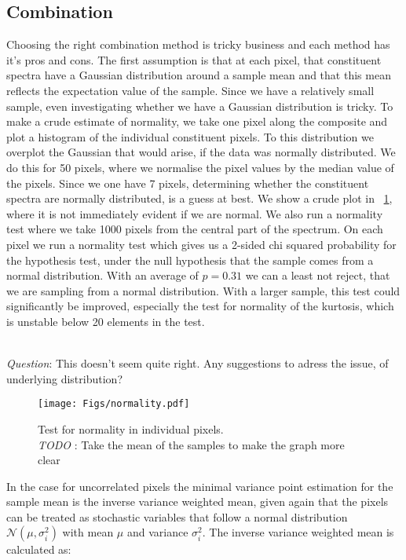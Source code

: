\documentclass{aa}    %
\newcommand{\figref}[1]{\ref{fig:#1}}
\newcommand{\Fig}[1]{\figurename~\figref{#1}}
\newcommand{\fig}[1]{\Fig{#1}}
\newcommand{\figlabel}[1]{\label{fig:#1}}
\newcommand{\sectlabel}[1]{\label{sect:#1}}
\newcommand{\todo}[3]{{\color{#2}\emph{#1}: #3}}
\newcommand{\jstodo}[1]{\todo{ \\TODO }{red}{#1}}
\newcommand{\qtodo}[1]{\todo{\\ Question}{red}{#1}}
\begin{document}
\subsection{Combination}  \sectlabel{combine}

Choosing the right combination method is tricky business and each method has it's pros and cons. The first assumption is that at each pixel, that constituent spectra have a Gaussian distribution around a sample mean and that this mean reflects the expectation value of the sample. Since we have a relatively small sample, even investigating whether we have a Gaussian distribution is tricky. To make a crude estimate of normality, we take one pixel along the composite and plot a histogram of the individual constituent pixels. To this distribution we overplot the Gaussian that would arise, if the data was normally distributed. We do this for 50 pixels, where we normalise the pixel values by the median value of the pixels. Since we one have 7 pixels, determining whether the constituent spectra are normally distributed, is a guess at best. We show a crude plot in \fig{normality}, where it is not immediately evident if we are normal. We also run a normality test where we take 1000 pixels from the central part of the spectrum. On each pixel we run a normality test which gives us a 2-sided chi squared probability for the hypothesis test, under the null hypothesis that the sample comes from a normal distribution. With an average of $p = 0.31$ we can a least not reject, that we are sampling from a normal distribution. With a larger sample, this test could significantly be improved, especially the test for normality of the kurtosis, which is unstable below 20 elements in the test. 

\qtodo{This doesn't seem quite right. Any suggestions to adress the issue, of underlying distribution?}

\begin{figure}[hbtp]
  \centering
  \texttt{[image: Figs/normality.pdf]}
  \caption[]{Test for normality in individual pixels. \jstodo{Take the mean of the samples to make the graph more clear}}
 \figlabel{normality}
\end{figure}

In the case for uncorrelated pixels the minimal variance point estimation for the sample mean is the inverse variance weighted mean, given again that the pixels can be treated as stochastic variables that follow a normal distribution $\mathcal{N}(\mu, \sigma_i^2)$ with mean $\mu$ and variance $\sigma_i^2$. The inverse variance weighted mean is calculated as:
\end{document}
